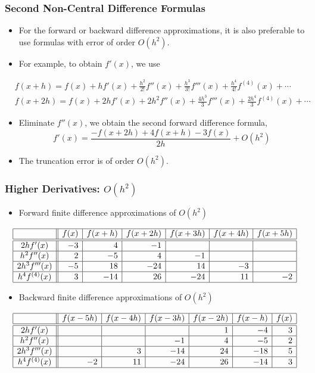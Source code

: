 \documentclass{beamer}
\begin{document}
\begin{frame}[fragile]
\frametitle{Second Non-Central Difference Formulas}
\begin{itemize}
\item For the forward or backward difference approximations, it is also preferable to use formulas with error of order $O(h^2)$.
\item For example, to obtain $f'(x)$, we use
\end{itemize}
\begin{align}
&f(x+h)=f(x)+hf'(x)+\frac{h^2}{2!} f''(x)+ \frac{h^3}{3!} f'''(x)+\frac{h^4}{4!} f^{(4)}(x)+\cdots\nonumber\\
&f(x+2h)=f(x)+2hf'(x)+2h^2 f''(x)+ \frac{4h^3}{3} f'''(x)+\frac{2h^4}{3} f^{(4)}(x)+\cdots\nonumber
\end{align}
\begin{itemize}
\item Eliminate $f''(x)$, we obtain the \alert{ second forward difference} formula,
\[
f'(x)=\frac{-f(x+2h)+4f(x+h)-3f(x)}{2h}+O(h^2)
\]
\item The truncation error is of order $O(h^2)$. 
\end{itemize}
\end{frame}
\begin{frame}[fragile]
\frametitle{Higher Derivatives: $O(h^2)$}

\begin{itemize}
\item Forward finite difference approximations of $O(h^2)$
\end{itemize}
\[
\begin{array}{|c||r|r|r|r|r|r|}
  \hline & f(x) & f(x+h) & f(x+2 h) & f(x+3 h) & f(x+4 h) & f(x+5 h) \\
  \hline \hline 2 h f^{\prime}(x) & -3 & 4 & -1 & & & \\
  \hline h^2 f^{\prime \prime}(x) & 2 & -5 & 4 & -1 & & \\
  \hline 2 h^3 f^{\prime \prime \prime}(x) & -5 & 18 & -24 & 14 & -3 & \\
  \hline h^4 f^{(4)}(x) & 3 & -14 & 26 & -24 & 11 & -2 \\
  \hline
\end{array}
\]
\begin{itemize}
\item Backward finite difference approximations of $O(h^2)$
\end{itemize}
\[
\begin{array}{|c||r|r|r|r|r|r|}
  \hline & f(x-5 h) & f(x-4 h) & f(x-3 h) & f(x-2 h) & f(x-h) & f(x) \\
  \hline \hline 2 h f^{\prime}(x) & & & & 1 & -4 & 3 \\
  \hline h^2 f^{\prime \prime}(x) & & & -1 & 4 & -5 & 2 \\
  \hline 2 h^3 f^{\prime \prime \prime}(x) & & 3 & -14 & 24 & -18 & 5 \\
  \hline h^4 f^{(4)}(x) & -2 & 11 & -24 & 26 & -14 & 3 \\
  \hline
  \end{array}
\]
\end{frame}
\end{document}
